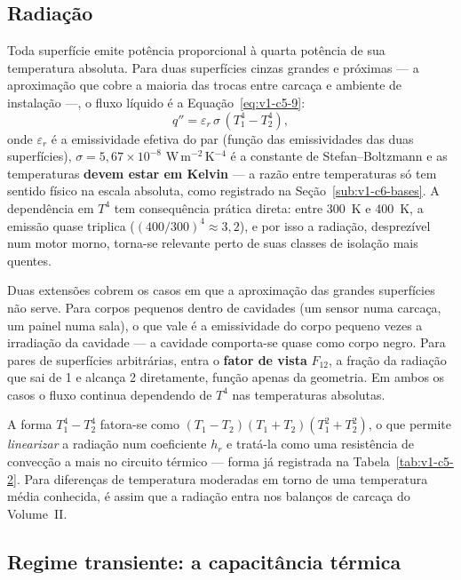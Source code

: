 \documentclass[12pt,a4paper]{article}
\numberwithin{equation}{section}
\numberwithin{table}{section}
\numberwithin{figure}{section}
\begin{document}
\subsection{Radiação}\label{sub:v1-c5-radiacao}

Toda superfície emite potência proporcional à quarta potência de sua
temperatura absoluta. Para duas superfícies cinzas grandes e próximas --- a
aproximação que cobre a maioria das trocas entre carcaça e ambiente de
instalação ---, o fluxo líquido é a Equação~\eqref{eq:v1-c5-9}:
\begin{equation}\label{eq:v1-c5-9}
q'' = \varepsilon_r \, \sigma \, (T_1^4 - T_2^4),
\end{equation}
onde $\varepsilon_r$ é a emissividade efetiva do par (função das
emissividades das duas superfícies), $\sigma = 5{,}67\times 10^{-8}$
W\,m$^{-2}$\,K$^{-4}$ é a constante de Stefan--Boltzmann e as temperaturas
\textbf{devem estar em Kelvin} --- a razão entre temperaturas só tem sentido
físico na escala absoluta, como registrado na
Seção~\ref{sub:v1-c6-bases}. A dependência em $T^4$ tem consequência
prática direta: entre 300~K e 400~K, a emissão quase triplica
($(400/300)^4 \approx 3{,}2$), e por isso a radiação, desprezível num motor
morno, torna-se relevante perto de suas classes de isolação mais quentes.

Duas extensões cobrem os casos em que a aproximação das grandes superfícies
não serve. Para corpos pequenos dentro de cavidades (um sensor numa carcaça,
um painel numa sala), o que vale é a emissividade do corpo pequeno vezes a
irradiação da cavidade --- a cavidade comporta-se quase como corpo negro.
Para pares de superfícies arbitrárias, entra o \textbf{fator de vista}
$F_{12}$, a fração da radiação que sai de 1 e alcança 2 diretamente, função
apenas da geometria. Em ambos os casos o fluxo continua dependendo de $T^4$
nas temperaturas absolutas.

A forma $T_1^4 - T_2^4$ fatora-se como $(T_1 - T_2)(T_1 + T_2)(T_1^2 +
T_2^2)$, o que permite \emph{linearizar} a radiação num coeficiente $h_r$ e
tratá-la como uma resistência de convecção a mais no circuito térmico ---
forma já registrada na Tabela~\ref{tab:v1-c5-2}. Para diferenças de
temperatura moderadas em torno de uma temperatura média conhecida, é assim
que a radiação entra nos balanços de carcaça do Volume~II.

\subsection{Regime transiente: a capacitância térmica}\label{sub:v1-c5-transiente}
\end{document}
